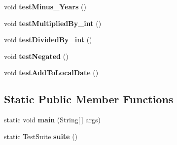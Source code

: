 \begin{DoxyCompactItemize}
\item 
\hypertarget{classorg_1_1joda_1_1time_1_1_test_years_a0c05a68c55e0e86debf435a332166215}{void {\bfseries test\-Minus\-\_\-\-Years} ()}\label{classorg_1_1joda_1_1time_1_1_test_years_a0c05a68c55e0e86debf435a332166215}

\item 
\hypertarget{classorg_1_1joda_1_1time_1_1_test_years_aa038cf96d79ff576dd32e3927cfaff51}{void {\bfseries test\-Multiplied\-By\-\_\-int} ()}\label{classorg_1_1joda_1_1time_1_1_test_years_aa038cf96d79ff576dd32e3927cfaff51}

\item 
\hypertarget{classorg_1_1joda_1_1time_1_1_test_years_ab6c49c73b5223da97e7477ccc2411a3a}{void {\bfseries test\-Divided\-By\-\_\-int} ()}\label{classorg_1_1joda_1_1time_1_1_test_years_ab6c49c73b5223da97e7477ccc2411a3a}

\item 
\hypertarget{classorg_1_1joda_1_1time_1_1_test_years_a0b80c8f16621beaecf1ee1b07f6eb1b6}{void {\bfseries test\-Negated} ()}\label{classorg_1_1joda_1_1time_1_1_test_years_a0b80c8f16621beaecf1ee1b07f6eb1b6}

\item 
\hypertarget{classorg_1_1joda_1_1time_1_1_test_years_a8e8dd513e2f308229f39df97c3a93dd8}{void {\bfseries test\-Add\-To\-Local\-Date} ()}\label{classorg_1_1joda_1_1time_1_1_test_years_a8e8dd513e2f308229f39df97c3a93dd8}

\end{DoxyCompactItemize}
\subsection*{Static Public Member Functions}
\begin{DoxyCompactItemize}
\item 
\hypertarget{classorg_1_1joda_1_1time_1_1_test_years_a960f615c2b6df08ce8bdaa4395a3d19b}{static void {\bfseries main} (String\mbox{[}$\,$\mbox{]} args)}\label{classorg_1_1joda_1_1time_1_1_test_years_a960f615c2b6df08ce8bdaa4395a3d19b}

\item 
\hypertarget{classorg_1_1joda_1_1time_1_1_test_years_a4360b79a5577aa64f82c5f06f161976d}{static Test\-Suite {\bfseries suite} ()}\label{classorg_1_1joda_1_1time_1_1_test_years_a4360b79a5577aa64f82c5f06f161976d}

\end{DoxyCompactItemize}
